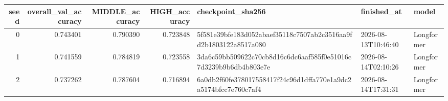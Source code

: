 \begin{tabular}{rrrrlll}
\toprule
seed & overall\_val\_accuracy & MIDDLE\_accuracy & HIGH\_accuracy & checkpoint\_sha256 & finished\_at & model \\
\midrule
0 & 0.743401 & 0.790390 & 0.723848 & 5f581e39bfe183d052abaef35118c7507ab2c3516aa9fd2b1803122a8517a080 & 2026-08-13T10:46:40 & Longformer \\
1 & 0.741559 & 0.784819 & 0.723558 & 3da6c59bb509622c70cb8d16c6dc6aaf585f0e51016c7d3239b9b6db4b803e7e & 2026-08-14T02:10:26 & Longformer \\
2 & 0.737262 & 0.787604 & 0.716894 & 6a0db2f60fe378017558417f24c96d1dffa770e1a9dc2a5174bfcc7e760c7af4 & 2026-08-14T17:31:31 & Longformer \\
\bottomrule
\end{tabular}

